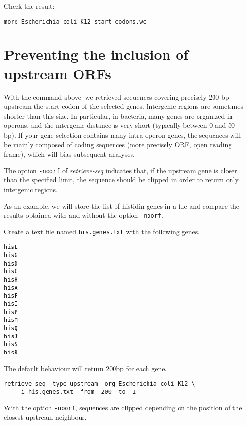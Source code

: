 Check the result:

{\color{blue} \begin{footnotesize}
\begin{verbatim}
more Escherichia_coli_K12_start_codons.wc
\end{verbatim}\end{footnotesize}}

\section{Preventing the inclusion of upstream ORFs}

With the command above, we retrieved sequences covering precisely 200
bp upstream the start codon of the selected genes. Intergenic regions
are sometimes shorter than this size. In particular, in bacteria, many
genes are organized in operons, and the intergenic distance is very
short (typically between 0 and 50 bp). If your gene selection contains
many intra-operon genes, the sequences will be mainly composed of
coding sequences (more precisely ORF, open reading frame), which will
bias subsequent analyses.

The option \texttt{-noorf} of \textit{retrieve-seq} indicates that, if
the upstream gene is closer than the specified limit, the sequence
should be clipped in order to return only intergenic regions.

As an example, we will store the list of histidin genes in a file and
compare the results obtained with and without the option
\texttt{-noorf}.

Create a text file named \texttt{his.genes.txt} with the following
genes.

{\color{blue} \begin{footnotesize}
\begin{verbatim}
hisL
hisG
hisD
hisC
hisH
hisA
hisF
hisI
hisP
hisM
hisQ
hisJ
hisS
hisR
\end{verbatim}\end{footnotesize}}

The default behaviour will return 200bp for each gene. 

{\color{blue} \begin{footnotesize}
\begin{verbatim}
retrieve-seq -type upstream -org Escherichia_coli_K12 \
    -i his.genes.txt -from -200 -to -1
\end{verbatim}\end{footnotesize}}

With the option \texttt{-noorf}, sequences are clipped depending on
the position of the closest upstream neighbour.

